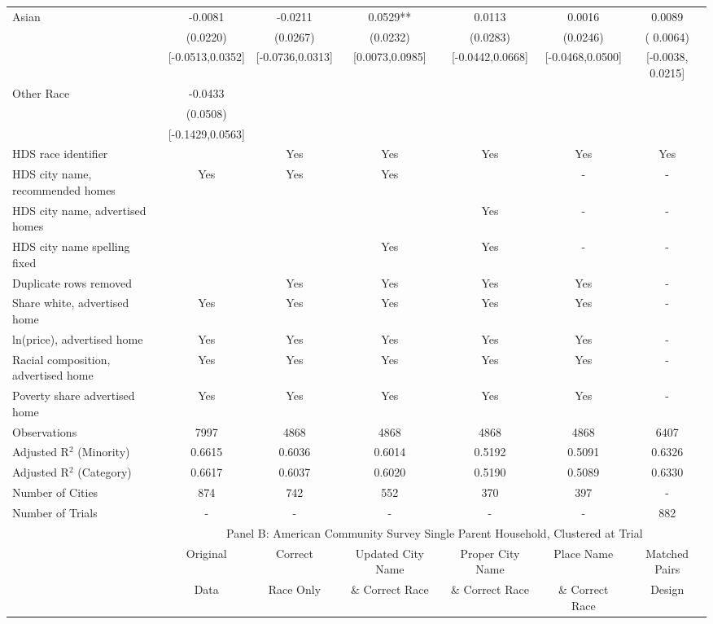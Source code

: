 \begin{table}[htbp]
{\begin{tabular}{l*{6}{c}}
Asian & -0.0081 & -0.0211 & 0.0529** & 0.0113 & 0.0016 & 0.0089 \\
 & (0.0220) & (0.0267) & (0.0232) & (0.0283) & (0.0246) & ( 0.0064) \\
 & [-0.0513,0.0352] & [-0.0736,0.0313] & [0.0073,0.0985] & [-0.0442,0.0668] & [-0.0468,0.0500] & [-0.0038,  0.0215] \\
Other Race & -0.0433 &  &  &  &  &  \\
 & (0.0508) &  &  &  &  &  \\
 & [-0.1429,0.0563] &  &  &  &  &  \\
\midrule
HDS race identifier & & Yes & Yes & Yes & Yes & Yes \\
HDS city name, recommended homes & Yes & Yes & Yes & & - & -\\
HDS city name, advertised homes &  &  &  & Yes & - & -\\
HDS city name spelling fixed & & & Yes & Yes & - & -\\
Duplicate rows removed &  & Yes & Yes & Yes & Yes & - \\
\midrule
Share white, advertised home  & Yes & Yes & Yes & Yes & Yes & - \\
ln(price), advertised home  & Yes & Yes & Yes & Yes & Yes & - \\
Racial composition, advertised home & Yes & Yes & Yes & Yes & Yes & - \\
Poverty share advertised home & Yes & Yes & Yes & Yes & Yes & - \\
Observations & 7997 & 4868 & 4868 & 4868 & 4868 & 6407 \\
Adjusted R$^2$ (Minority) & 0.6615 & 0.6036 & 0.6014 & 0.5192 & 0.5091 & 0.6326 \\
Adjusted R$^2$ (Category) & 0.6617 & 0.6037 & 0.6020 & 0.5190 & 0.5089 & 0.6330 \\
Number of Cities & 874 & 742 & 552 & 370 & 397 & - \\
Number of Trials & - & - & - & - & - & 882 \\
\bottomrule
\toprule
& \multicolumn{6}{c}{Panel B: American Community Survey Single Parent Household, Clustered at Trial}\\
\toprule
                    &\multicolumn{1}{c}{Original}&\multicolumn{1}{c}{Correct}&\multicolumn{1}{c}{Updated City Name}&\multicolumn{1}{c}{Proper City Name}&\multicolumn{1}{c}{Place Name}&\multicolumn{1}{c}{Matched Pairs}\\
                      &\multicolumn{1}{c}{Data}&\multicolumn{1}{c}{Race Only}&\multicolumn{1}{c}{\& Correct Race}&\multicolumn{1}{c}{\& Correct Race}&\multicolumn{1}{c}{\& Correct Race}&\multicolumn{1}{c}{Design}\\                  

\end{tabular}}
\end{table}
